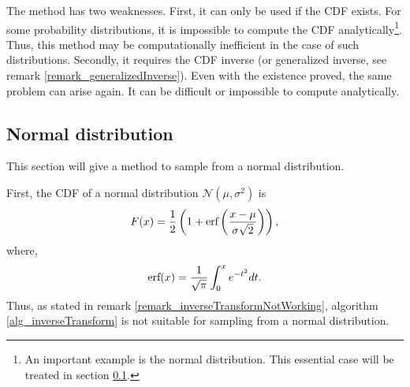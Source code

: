 \begin{remark} \label{remark_inverseTransformNotWorking}
  The method has two weaknesses. First, it can only be used if the CDF exists. For some probability distributions, it is impossible to compute the CDF analytically\footnote{An important example is the normal distribution. This essential case will be treated in section \ref{sec_samplingGaussian}.}. Thus, this method may be computationally inefficient in the case of such distributions. Secondly, it requires the CDF inverse (or generalized inverse, see remark \ref{remark_generalizedInverse}). Even with the existence proved, the same problem can arise again. It can be difficult or impossible to compute analytically.
\end{remark}


\subsection{Normal distribution} \label{sec_samplingGaussian}

This section will give a method to sample from a normal distribution.

First, the CDF of a normal distribution $\mathcal{N}(\mu, \sigma^2)$ is
$$
  F(x) = \frac{1}{2}\left( 1 + \textup{erf}\left( \frac{x-\mu}{\sigma\sqrt{2}} \right) \right),
$$
where, 
$$
  \textup{erf}(x) = \frac{1}{\sqrt{\pi}}\int_0^x e^{-t^2}dt.
$$ 
Thus, as stated in remark \ref{remark_inverseTransformNotWorking}, algorithm \ref{alg_inverseTransform} is not suitable for sampling from a normal distribution.

